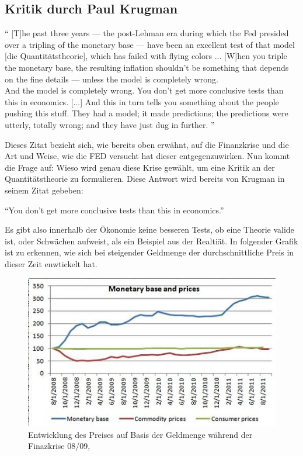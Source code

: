 \subsection{Kritik durch Paul Krugman}

\enquote{
[T]he past three years — the post-Lehman era during which the Fed presided over a tripling of the monetary base — have been an excellent test of that model [die Quantitätstheorie], which has failed with flying colors ... [W]hen you triple the monetary base, the resulting inflation shouldn’t be something that depends on the fine details — unless the model is completely wrong.\\
And the model is completely wrong. You don’t get more conclusive tests than this in economics. [...] 
And this in turn tells you something about the people pushing this stuff. They had a model; it made predictions; the predictions were utterly, totally wrong; and they have just dug in further.
}\autocite{Krugman2011} 

Dieses Zitat bezieht sich, wie bereits oben erwähnt, auf die Finanzkrise und die Art und Weise, wie die FED versucht hat dieser entgegenzuwirken. Nun kommt die Frage auf: Wieso wird genau diese Krise gewählt, um eine Kritik an der Quantitätstheorie zu formulieren. Diese Antwort wird bereits von Krugman in seinem Zitat gebeben:
\begin{center}
    \enquote{You don’t get more conclusive tests than this in economics.}
\end{center}

Es gibt also innerhalb der Ökonomie keine besseren Tests, ob eine Theorie valide ist, oder Schwächen aufweist, als ein Beispiel aus der Realtiät. In folgender Grafik ist zu erkennen, wie sich bei steigender Geldmenge der durchschnittliche Preis in dieser Zeit enwtickelt hat.

\begin{figure}[H]
    \centering
    \includegraphics{img/100711krugman3-blog480.jpg}
    \caption{Entwicklung des Preises auf Basis der Geldmenge während der Finazkrise 08/09, \cite{Krugman2011}}
\end{figure}    

